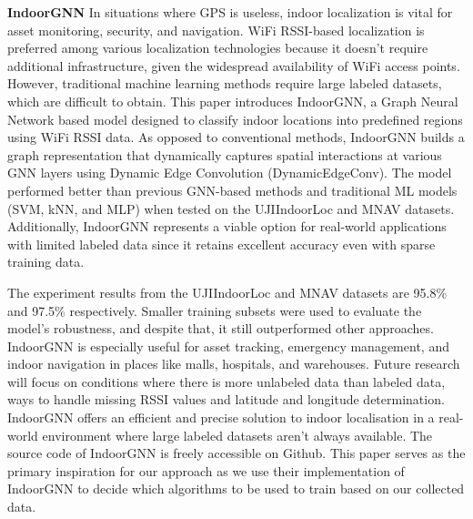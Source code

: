 \documentclass[conference]{IEEEtran}
\begin{document}
	{\bfseries IndoorGNN}
	In situations where GPS is useless, indoor localization is vital for asset monitoring, security, and navigation. WiFi RSSI-based localization is preferred among various localization technologies because it doesn't require additional infrastructure, given the widespread availability of WiFi access points. However, traditional machine learning methods require large labeled datasets, which are difficult to obtain. This paper introduces IndoorGNN, a Graph Neural Network based model designed to classify indoor locations into predefined regions using WiFi RSSI data. As opposed to conventional methods, IndoorGNN builds a graph representation that dynamically captures spatial interactions at various GNN layers using Dynamic Edge Convolution (DynamicEdgeConv). The model performed better than previous GNN-based methods and traditional ML models (SVM, kNN, and MLP) when tested on the UJIIndoorLoc and MNAV datasets. Additionally, IndoorGNN represents a viable option for real-world applications with limited labeled data since it retains excellent accuracy even with sparse training data.
	
	The experiment results from the UJIIndoorLoc and MNAV datasets are 95.8\% and 97.5\% respectively. Smaller training subsets were used to evaluate the model's robustness, and despite that, it still outperformed other approaches. IndoorGNN is especially useful for asset tracking, emergency management, and indoor navigation in places like malls, hospitals, and warehouses. Future research will focus on conditions where there is more unlabeled data than labeled data, ways to handle missing RSSI values and latitude and longitude determination.  IndoorGNN offers an efficient and precise solution to indoor localisation in a real-world environment where large labeled datasets aren't always available. The source code of IndoorGNN is freely accessible on Github. This paper serves as the primary inspiration for our approach as we use their implementation of IndoorGNN to decide which algorithms to be used to train based on our collected data. 
	
\end{document}
